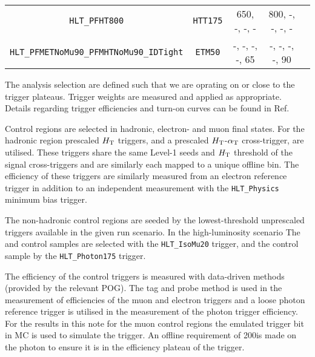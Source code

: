 \begin{table}[h!]
\begin{tabular}{c|cccc}
{\scriptsize \verb!HLT_PFHT800!}                         & {\scriptsize \verb!HTT175!}          & 650, -, -, -      & 800, -, -, -, -   \\ %
{\scriptsize \verb!HLT_PFMETNoMu90_PFMHTNoMu90_IDTight!} & {\scriptsize \verb!ETM50!}           &  -, -, -, -, 65   & -, -, -, -, 90    \\
\hline
\hline
\end{tabular}
\label{tab:2015_Hadronic_Signal_Triggers}
\end{table}


The analysis selection are defined such that we are oprating on or close to the trigger plateaus. Trigger weights are measured and applied
as appropriate. Details regarding trigger efficiencies and turn-on curves can be found in Ref.~\cite{alpaTnote}


Control regions are selected in hadronic, electron- and muon final states. For the hadronic region 
prescaled $\mbox{$H_\text{T}$}$ triggers, and a prescaled  $\mbox{$H_\text{T}$}$-$\alpha_{\text{T}}$ cross-trigger, are utilised.
These triggers share the same Level-1 seeds and $\mbox{$H_\text{T}$}$ threshold of the signal cross-triggers and are similarly each mapped 
to a unique offline bin. The efficiency of these triggers are similarly measured from an electron 
reference trigger in addition to an independent measurement with the \verb!HLT_Physics! 
minimum bias trigger.


The non-hadronic control regions are seeded by the lowest-threshold unprescaled triggers available in the given run scenario. In the high-luminosity scenario The 
\mj and \mmj control samples are selected with the \verb!HLT_IsoMu20! trigger, and the \gj control sample by the \verb!HLT_Photon175! trigger. 

The efficiency of the control triggers is measured with data-driven methods (provided by the relevant POG). The tag and probe method is used in the measurement of
efficiencies of the muon and electron triggers and a loose photon reference trigger  is utilised in the measurement of the photon trigger efficiency. For the results in 
this note for the muon control regions the emulated trigger bit in MC is used to simulate  the trigger. An offline \Pt requirement of 200\GeV is made on the photon
to ensure it is in the efficiency plateau of the trigger.



